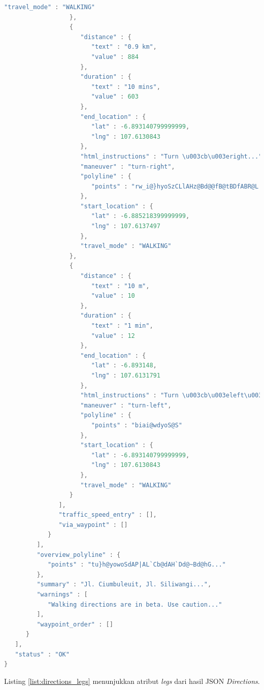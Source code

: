 \begin{lstlisting}[caption={Atribut \textit{legs} dari \textit{Directions API}},label={list:directions_legs},language=java]
                     "travel_mode" : "WALKING"
                  },
                  {
                     "distance" : {
                        "text" : "0.9 km",
                        "value" : 884
                     },
                     "duration" : {
                        "text" : "10 mins",
                        "value" : 603
                     },
                     "end_location" : {
                        "lat" : -6.893140799999999,
                        "lng" : 107.6130843
                     },
                     "html_instructions" : "Turn \u003cb\u003eright...",
                     "maneuver" : "turn-right",
                     "polyline" : {
                        "points" : "rw_i@}hyoSzCLlAHz@Bd@@fB@tBDfABR@L..."
                     },
                     "start_location" : {
                        "lat" : -6.885218399999999,
                        "lng" : 107.6137497
                     },
                     "travel_mode" : "WALKING"
                  },
                  {
                     "distance" : {
                        "text" : "10 m",
                        "value" : 10
                     },
                     "duration" : {
                        "text" : "1 min",
                        "value" : 12
                     },
                     "end_location" : {
                        "lat" : -6.893148,
                        "lng" : 107.6131791
                     },
                     "html_instructions" : "Turn \u003cb\u003eleft\u003c...",
                     "maneuver" : "turn-left",
                     "polyline" : {
                        "points" : "biai@wdyoS@S"
                     },
                     "start_location" : {
                        "lat" : -6.893140799999999,
                        "lng" : 107.6130843
                     },
                     "travel_mode" : "WALKING"
                  }
               ],
               "traffic_speed_entry" : [],
               "via_waypoint" : []
            }
         ],
         "overview_polyline" : {
            "points" : "tu}h@yowoSdAP|AL`Cb@dAH`Dd@~Bd@hG..."
         },
         "summary" : "Jl. Ciumbuleuit, Jl. Siliwangi...",
         "warnings" : [
            "Walking directions are in beta. Use caution..."
         ],
         "waypoint_order" : []
      }
   ],
   "status" : "OK"
}
\end{lstlisting}

Listing \ref{list:directions_legs} menunjukkan atribut \textit{legs} dari hasil JSON \textit{Directions}.



